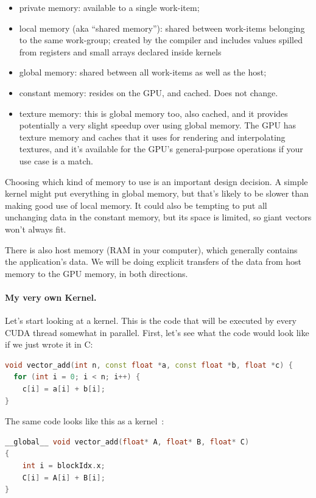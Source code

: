 \documentclass[a4paper]{report}
\newcommand{\CPP}{C\nolinebreak\hspace{-.05em}\raisebox{.4ex}{\tiny\bf +}\nolinebreak\hspace{-.10em}\raisebox{.4ex}{\tiny\bf +}}
\def\CPP{{C\nolinebreak[4]\hspace{-.05em}\raisebox{.4ex}{\tiny\bf ++}}}
\begin{document}
\begin{itemize}
\item private memory: available to a single work-item;
\item local memory (aka ``shared memory''): shared between work-items
  belonging to the same work-group; created by the compiler and includes values spilled from registers and small arrays declared inside kernels~\cite{micikevicius11:_local_memor_regis_spill}
\item global memory: shared between all work-items as well as the host;
\item constant memory: resides on the GPU, and cached. Does not change.
\item texture memory: this is global memory too, also cached, and it provides potentially a very slight speedup over using global memory. The GPU has texture memory and caches that it uses for rendering and interpolating textures, and it's available for the GPU's general-purpose operations if your use case is a match. 
\end{itemize}

Choosing which kind of memory to use is an important design decision. A simple kernel might put everything in global memory, but that's likely to be slower than making good use of local memory. It could also be tempting to put all unchanging data in the constant memory, but its space is limited, so giant vectors won't always fit.

There is also host memory (RAM in your computer), which generally contains the application's data. We will be doing explicit transfers of the data from host memory to the GPU memory, in both directions.

\paragraph{My very own Kernel.} Let's start looking at a kernel. This is the code that will be executed by every CUDA thread somewhat in parallel. First, let's see what the code would look like if we just wrote it in \CPP:

\begin{lstlisting}[language=C++]
void vector_add(int n, const float *a, const float *b, float *c) {
  for (int i = 0; i < n; i++) {
    c[i] = a[i] + b[i];
}
\end{lstlisting}


The same code looks like this as a kernel~\cite{cuda}:
\begin{lstlisting}[language=C++]
__global__ void vector_add(float* A, float* B, float* C)
{
    int i = blockIdx.x;
    C[i] = A[i] + B[i];
}
\end{lstlisting}
\end{document}
